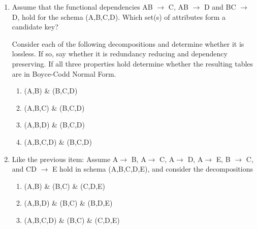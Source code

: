 \begin{enumerate}[label=\alph*.]
  \item Assume that the functional dependencies AB $\rightarrow$ C, AB $\rightarrow$ D and BC $\rightarrow$ D, hold for the schema
  (A,B,C,D). Which set(s) of attributes form a candidate key?

  Consider each of the following decompositions and determine whether it is lossless. If so, say whether it is
  redundancy reducing and dependency preserving. If all three properties hold determine whether the resulting
  tables are in Boyce-Codd Normal Form.

  \begin{enumerate}[label=\roman*.]
    \item (A,B) \& (B,C,D)
    \item (A,B,C) \& (B,C,D)
    \item (A,B,D) \& (B,C,D)
    \item (A,B,C,D) \& (B,C,D)
  \end{enumerate}

  \item Like the previous item: Assume A$\rightarrow$ B, A$\rightarrow$ C, A$\rightarrow$ D, A$\rightarrow$ E, B $\rightarrow$ C, and CD $\rightarrow$ E hold in schema
  (A,B,C,D,E), and consider the decompositions

  \begin{enumerate}[label=\roman*.]
    \item (A,B) \& (B,C) \& (C,D,E)
    \item (A,B,D) \& (B,C) \& (B,D,E)
    \item (A,B,C,D) \& (B,C) \& (C,D,E)
  \end{enumerate}
\end{enumerate}

